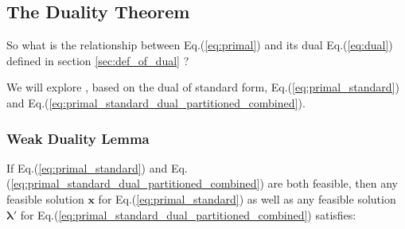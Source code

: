 \documentclass[twocolumn]{ctexart}
\begin{document}
\subsection{The Duality Theorem}

So what is the relationship between Eq.(\ref{eq:primal}) and its dual Eq.(\ref{eq:dual}) defined in section \ref{sec:def_of_dual} ?

We will explore
, based on the dual of standard form,
Eq.(\ref{eq:primal_standard}) and Eq.(\ref{eq:primal_standard_dual_partitioned_combined}).


\subsubsection{Weak Duality Lemma}


If
Eq.(\ref{eq:primal_standard})
and
Eq.(\ref{eq:primal_standard_dual_partitioned_combined})
are both feasible,
then
any feasible solution $\mathbf{x}$        for Eq.(\ref{eq:primal_standard})
as well as
any feasible solution $\mathbf{\lambda}'$ for Eq.(\ref{eq:primal_standard_dual_partitioned_combined})
satisfies:
\end{document}
